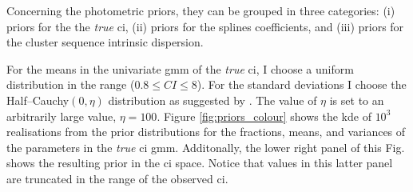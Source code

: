 Concerning the photometric priors, they can be grouped in three categories: (i) priors for the the \emph{true} \gls{ci}, (ii) priors for the splines coefficients, and (iii) priors for the cluster sequence intrinsic dispersion. 

For the means in the univariate \gls{gmm} of the \emph{true} \gls{ci}, I choose a uniform distribution in the range  ($0.8\leq CI \leq8$). For the standard deviations I choose the Half--Cauchy$(0,\eta)$ distribution as suggested by \citet{Gelman2006}. The value of $\eta$ is set to an arbitrarily large value, $\eta=100$. Figure \ref{fig:priors_colour} shows the \gls{kde} of $10^3$ realisations from the prior distributions for the fractions, means, and variances of the parameters in the  \emph{true} \gls{ci} \gls{gmm}. Additonally, the lower right panel of this Fig. shows the resulting prior in the \gls{ci} space. Notice that values in this latter panel are truncated in the range of the observed \gls{ci}.

